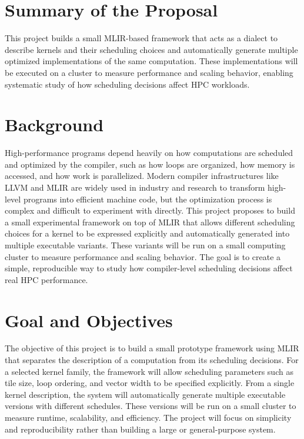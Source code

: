 \section*{Summary of the Proposal}

This project builds a small MLIR-based framework that acts as a dialect to describe kernels and their scheduling choices and automatically generate multiple optimized implementations of the same computation. These implementations will be executed on a cluster to measure performance and scaling behavior, enabling systematic study of how scheduling decisions affect HPC workloads.

\section*{Background}

High-performance programs depend heavily on how computations are scheduled and optimized by the compiler, such as how loops are organized, how memory is accessed, and how work is parallelized. Modern compiler infrastructures like LLVM and MLIR are widely used in industry and research to transform high-level programs into efficient machine code, but the optimization process is complex and difficult to experiment with directly. This project proposes to build a small experimental framework on top of MLIR that allows different scheduling choices for a kernel to be expressed explicitly and automatically generated into multiple executable variants. These variants will be run on a small computing cluster to measure performance and scaling behavior. The goal is to create a simple, reproducible way to study how compiler-level scheduling decisions affect real HPC performance.

\section*{Goal and Objectives}

The objective of this project is to build a small prototype framework using MLIR that separates the description of a computation from its scheduling decisions. For a selected kernel family, the framework will allow scheduling parameters such as tile size, loop ordering, and vector width to be specified explicitly. From a single kernel description, the system will automatically generate multiple executable versions with different schedules. These versions will be run on a small cluster to measure runtime, scalability, and efficiency. The project will focus on simplicity and reproducibility rather than building a large or general-purpose system.

